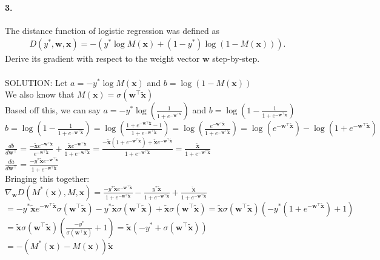 \documentclass{article}
\newcommand{\vect}[1]{\mathbf{#1}}
\newcommand{\vx}[0]{\vect{x}}
\newcommand{\vw}[0]{\vect{w}}
\newcommand{\sigmoid}{\sigma}
\begin{document}
\paragraph{3.} The distance function of logistic regression was defined as 
\begin{align*}
    D(y^*, \vw, \vx) = -(y^* \log M(\vx) + (1-y^*) \log (1- M(\vx))).
\end{align*}
Derive its gradient with respect to the weight vector $\vw$ step-by-step.
\\
\\
SOLUTION: 
Let $a = -y^* \log M(\vx)$ and $b =  \log (1- M(\vx))$ \\
We also know that $M(\vx) = \sigmoid(\vw^\top \tilde{\vx}) $ \\
Based off this, we can say $a = -y^* \log ( \frac{1}{1+e^{-\vw^{\top \tilde{\vx}}}})$ and $b =  \log (1- \frac{1}{1+e^{-\vw^\top \tilde{\vx}}})$ \\
$b = \log (1- \frac{1}{1+e^{-\vw^\top \tilde{\vx}}}) = \log ( \frac{1+e^{-\vw^\top \tilde{\vx} } - 1}{1+e^{-\vw^\top \tilde{\vx}}}) = \log ( \frac{e^{-\vw^\top \tilde{\vx} }}{1+e^{-\vw^\top \tilde{\vx}}}) =  \log ( e^{-\vw^\top \tilde{\vx} } ) - \log (1+e^{-\vw^\top \tilde{\vx}}) $ \\
$ \frac{db}{d \vw^\top} = \frac{-\tilde{\vx} e^{-\vw^\top \tilde{\vx}}}{e^{-\vw^\top \tilde{\vx}}} + \frac{\tilde{\vx} e^{-\vw^\top \tilde{\vx}}}{1 + e^{-\vw^\top \tilde{\vx}}}  = \frac{-\tilde{\vx} (1 + e^{-\vw^\top \tilde{\vx}}) +\tilde{\vx} e^{-\vw^\top \tilde{\vx}}}{1 + e^{-\vw^\top \tilde{\vx}}}  = \frac{\tilde{\vx}}{1 + e^{-\vw^\top \tilde{\vx}}}$ \\
$ \frac{da}{d \vw^\top} = \frac {-y^* \tilde{\vx}e^{-\vw^\top \tilde{\vx}}}{1 + e^{-\vw^\top \tilde{\vx}}}$ \\
Bringing this together: \\
$ \nabla_{\vw} D(M^*(\vx), M, \vx) =  \frac {-y^* \tilde{\vx}e^{-\vw^\top \tilde{\vx}}}{1 + e^{-\vw^\top \tilde{\vx}}} - \frac{y^* \tilde{\vx}}{1 + e^{-\vw^\top \tilde{\vx}}} + \frac{\tilde{\vx}}{1 + e^{-\vw^\top \tilde{\vx}}} $ \\
$ = -y^* \tilde{\vx}e^{-\vw^\top \tilde{\vx}} \sigmoid(\vw^\top \tilde{\vx}) -y^* \tilde{\vx}\sigmoid(\vw^\top \tilde{\vx}) + \tilde{\vx}\sigmoid(\vw^\top \tilde{\vx}) = \tilde{\vx}\sigmoid(\vw^\top \tilde{\vx}) (-y^* (1 + e^{-\vw^\top \tilde{\vx}}) + 1)$ \\
$ = \tilde{\vx}\sigmoid(\vw^\top \tilde{\vx}) (\frac{-y^* }{\sigmoid(\vw^\top \tilde{\vx})} + 1) = \tilde{\vx} (-y^* + \sigmoid(\vw^\top \tilde{\vx}))$ \\
$ = -(M^*(\vx) - M(\vx)) \tilde{\vx}$
\end{document}
